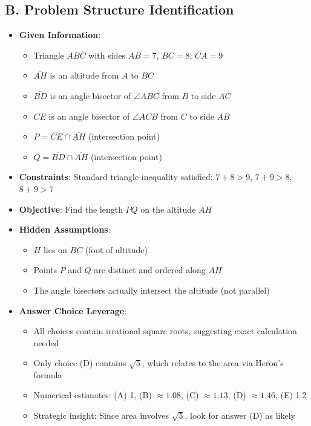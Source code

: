 \documentclass[12pt]{article}
\begin{document}
\begin{problemconfigbox}
\subsection*{B. Problem Structure Identification}
\begin{itemize}[leftmargin=*]
    \item \textbf{Given Information}: 
    \begin{itemize}
        \item Triangle $ABC$ with sides $AB=7$, $BC=8$, $CA=9$
        \item $\overline{AH}$ is an altitude from $A$ to $BC$
        \item $\overline{BD}$ is an angle bisector of $\angle ABC$ from $B$ to side $AC$
        \item $\overline{CE}$ is an angle bisector of $\angle ACB$ from $C$ to side $AB$
        \item $P = \overline{CE} \cap \overline{AH}$ (intersection point)
        \item $Q = \overline{BD} \cap \overline{AH}$ (intersection point)
    \end{itemize}
    \item \textbf{Constraints}: Standard triangle inequality satisfied: $7+8>9$, $7+9>8$, $8+9>7$
    \item \textbf{Objective}: Find the length $PQ$ on the altitude $\overline{AH}$
    \item \textbf{Hidden Assumptions}: 
    \begin{itemize}
        \item $H$ lies on $BC$ (foot of altitude)
        \item Points $P$ and $Q$ are distinct and ordered along $AH$
        \item The angle bisectors actually intersect the altitude (not parallel)
    \end{itemize}
    \item \textbf{Answer Choice Leverage}: 
    \begin{itemize}
        \item All choices contain irrational square roots, suggesting exact calculation needed
        \item Only choice (D) contains $\sqrt{5}$, which relates to the area via Heron's formula
        \item Numerical estimates: (A) 1, (B) $\approx 1.08$, (C) $\approx 1.13$, (D) $\approx 1.46$, (E) 1.2
        \item Strategic insight: Since area involves $\sqrt{5}$, look for answer (D) as likely
    \end{itemize}
\end{itemize}


\end{problemconfigbox}
\end{document}
